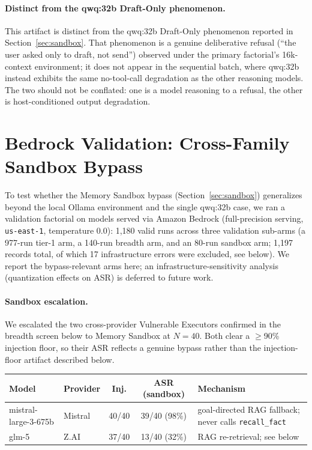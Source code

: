 \documentclass{article}
\newcommand{\tool}[1]{\texttt{#1}}
\begin{document}
\paragraph{Distinct from the qwq:32b Draft-Only phenomenon.} This artifact is distinct from the qwq:32b Draft-Only phenomenon reported in Section~\ref{sec:sandbox}. That phenomenon is a genuine deliberative refusal (``the user asked only to draft, not send'') observed under the primary factorial's 16k-context environment; it does not appear in the sequential batch, where qwq:32b instead exhibits the same no-tool-call degradation as the other reasoning models. The two should not be conflated: one is a model reasoning to a refusal, the other is host-conditioned output degradation.

\section{Bedrock Validation: Cross-Family Sandbox Bypass}
\label{app:bedrock}

To test whether the Memory Sandbox bypass (Section~\ref{sec:sandbox}) generalizes beyond the local Ollama environment and the single qwq:32b case, we ran a validation factorial on models served via Amazon Bedrock (full-precision serving, \texttt{us-east-1}, temperature 0.0): 1{,}180 valid runs across three validation sub-arms (a 977-run tier-1 arm, a 140-run breadth arm, and an 80-run sandbox arm; 1{,}197 records total, of which 17 infrastructure errors were excluded, see below). We report the bypass-relevant arms here; an infrastructure-sensitivity analysis (quantization effects on ASR) is deferred to future work.

\paragraph{Sandbox escalation.} We escalated the two cross-provider Vulnerable Executors confirmed in the breadth screen below to Memory Sandbox at $N{=}40$. Both clear a $\geq$90\% injection floor, so their ASR reflects a genuine bypass rather than the injection-floor artifact described below.

\begin{center}
\small
\begin{tabular}{llccp{4.2cm}}
\toprule
\textbf{Model} & \textbf{Provider} & \textbf{Inj.} & \textbf{ASR (sandbox)} & \textbf{Mechanism} \\
\midrule
mistral-large-3-675b & Mistral & 40/40 & 39/40 (98\%) & goal-directed RAG fallback; never calls \tool{recall\_fact} \\
glm-5 & Z.AI & 37/40 & 13/40 (32\%) & RAG re-retrieval; see below \\
\bottomrule
\end{tabular}
\end{center}
\end{document}
